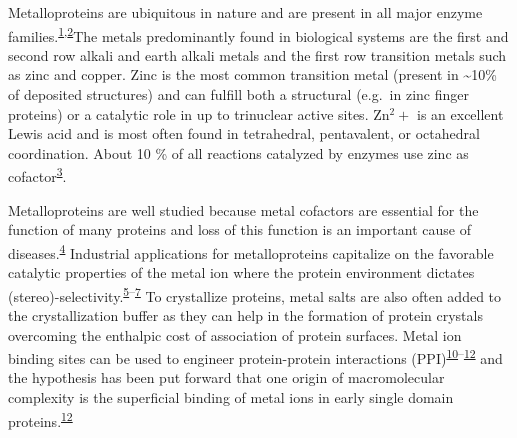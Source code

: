 \documentclass[  ASAPversion,
  ,
  9pt]{elife}
\begin{document}
Metalloproteins are ubiquitous in nature and are present in all major enzyme families.\textsuperscript{\protect\hyperlink{ref-gxiv5uTU}{1},\protect\hyperlink{ref-LY9UGI7}{2}}The metals predominantly found in biological systems are the first and second row alkali and earth alkali metals and the first row transition metals such as zinc and copper. Zinc is the most common transition metal (present in \textasciitilde10\% of deposited structures) and can fulfill both a structural (e.g.~in zinc finger proteins) or a catalytic role in up to trinuclear active sites. Zn$^2+$ is an excellent Lewis acid and is most often found in tetrahedral, pentavalent, or octahedral coordination. About 10 \% of all reactions catalyzed by enzymes use zinc as cofactor\textsuperscript{\protect\hyperlink{ref-iqbHG3rv}{3}}.

Metalloproteins are well studied because metal cofactors are essential for the function of many proteins and loss of this function is an important cause of diseases.\textsuperscript{\protect\hyperlink{ref-4sXp2sDw}{4}} Industrial applications for metalloproteins capitalize on the favorable catalytic properties of the metal ion where the protein environment dictates (stereo)-selectivity.\textsuperscript{\protect\hyperlink{ref-oOm5j05D}{5}--\protect\hyperlink{ref-13w4SiWCx}{7}} To crystallize proteins, metal salts are also often added to the crystallization buffer as they can help in the formation of protein crystals overcoming the enthalpic cost of association of protein surfaces. Metal ion binding sites can be used to engineer protein-protein interactions (PPI)\textsuperscript{\protect\hyperlink{ref-ROLANnJl}{10}--\protect\hyperlink{ref-17JMFzNJo}{12}} and the hypothesis has been put forward that one origin of macromolecular complexity is the superficial binding of metal ions in early single domain proteins.\textsuperscript{\protect\hyperlink{ref-17JMFzNJo}{12}}
\end{document}
